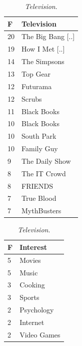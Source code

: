 \begin{table}[h]
\begin{minipage}[b]{.32\textwidth}
\centering
  \begin{tabular}{|l|l|} %
  \hline
  	\small{\textbf{F}} & \small{\textbf{Television}} \\ \hline
		\small{20} & \small{The Big Bang [..]} \\ \hline
		\small{19} & \small{How I Met [..]} \\ \hline
		\small{14} & \small{The Simpsons} \\ \hline
		\small{13} & \small{Top Gear} \\ \hline
		\small{12} & \small{Futurama} \\ \hline
		\small{12} & \small{Scrubs} \\ \hline
		\small{11} & \small{Black Books} \\ \hline
		\small{10} & \small{Black Books} \\ \hline
		\small{10} & \small{South Park} \\ \hline
		\small{10} & \small{Family Guy} \\ \hline
		\small{9} & \small{The Daily Show} \\ \hline
		\small{8} & \small{The IT Crowd} \\ \hline
		\small{8} & \small{FRIENDS} \\ \hline
		\small{7} & \small{True Blood} \\ \hline
		\small{7} & \small{MythBusters} \\ \hline
  \end{tabular}
  \caption{\emph{Television}.}
\end{minipage}
\begin{minipage}[b]{.33\textwidth}
\centering
  \begin{tabular}{|l|l|} %
  \hline
  	\small{\textbf{F}} & \small{\textbf{Interest}} \\ \hline
		\small{5} & \small{Movies} \\ \hline
		\small{5} & \small{Music} \\ \hline
		\small{3} & \small{Cooking} \\ \hline
		\small{3} & \small{Sports} \\ \hline
		\small{2} & \small{Psychology} \\ \hline
		\small{2} & \small{Internet} \\ \hline
		\small{2} & \small{Video Games} \\ \hline

\end{tabular}
\end{minipage}
\end{table}
